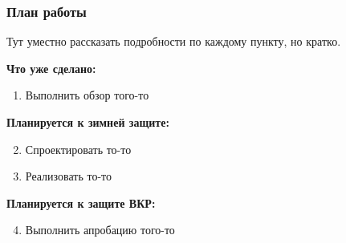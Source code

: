 \documentclass{vkr-slides-style}
\begin{document}
\begin{frame}  
    \frametitle{План работы}
    Тут уместно рассказать подробности по каждому пункту, но кратко.
    
    \textbf{Что уже сделано:}
    \begin{enumerate}
        \item Выполнить обзор того-то
    \end{enumerate}

    \textbf{Планируется к зимней защите:}
    \begin{enumerate}
        \setcounter{enumi}{1}
        \item Спроектировать то-то
        \item Реализовать то-то
    \end{enumerate}

    \textbf{Планируется к защите ВКР:}
    \begin{enumerate}
        \setcounter{enumi}{3}
        \item Выполнить апробацию того-то
    \end{enumerate}
\end{frame}
\end{document}
